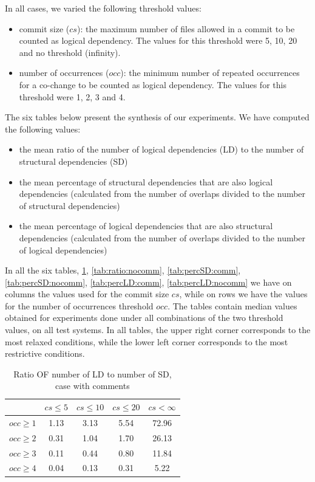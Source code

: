 \documentclass[a4paper,twoside]{article}
\begin{document}
In all cases, we varied the following threshold values: 
 \begin{itemize}
	\item commit size ($cs$): the maximum number of files allowed in a commit to be counted as logical dependency. The values for this threshold were 5, 10, 20 and no threshold (infinity).  
	\item number of occurrences ($occ$): the minimum number of repeated occurrences for a co-change to be counted as logical dependency. The values for this threshold were 1, 2, 3 and 4.  
\end{itemize}

The six tables below present the synthesis of our experiments. 
We have computed the following  values:
\begin{itemize}
	\item the mean ratio of the number of logical dependencies  (LD) to the number of structural dependencies (SD)
   \item the mean percentage of structural dependencies that are also logical dependencies (calculated from the number of overlaps divided to the number of structural dependencies)	
		\item the mean percentage of logical dependencies that are also structural dependencies (calculated from the number of overlaps divided to the number of logical dependencies)
\end{itemize}

In all the six tables, \ref{tab:ratio:comm}, \ref{tab:ratio:nocomm}, \ref{tab:percSD:comm}, \ref{tab:percSD:nocomm},
\ref{tab:percLD:comm}, \ref{tab:percLD:nocomm} we have on columns the values used for the commit size $cs$, while on rows we have the values for the number of occurrences threshold $occ$. The tables contain median values obtained for experiments done under all combinations of the two threshold values, on all test systems. In all tables, the upper right corner corresponds to the most relaxed conditions, while the lower left corner corresponds to the most restrictive conditions.


\begin{table}[!h]
\renewcommand{\arraystretch}{1.25}
\caption{Ratio OF number of LD to number of SD, case with comments}
\label{tab:ratio:comm}
\centering

\begin{tabular}{|c|c|c|c|c|}
\hline
	      &	$cs\leq 5$	&	$cs\leq 10$	&	$cs\leq 20$	&	$cs<\infty$	\\
\hline
$occ\geq 1$	&	1.13	&	3.13	&	5.54	&	72.96	\\
$occ\geq 2$	&	0.31	&	1.04	&	1.70	&	26.13	\\
$occ\geq 3$	&	0.11	&	0.44	&	0.80	&	11.84	\\
$occ\geq 4$	&	0.04	&	0.13	&	0.31	&	5.22	\\
\hline
\end{tabular}
\end{table}
\end{document}

